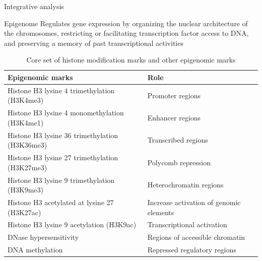 \documentclass[slidestop,compress,11pt,xcolor=dvipsnames]{beamer}
\begin{document}
\begin{frame}{Integrative analysis}
 \vspace*{-0.3cm}
\begin{block}{Epigenome}
       Regulates gene expression by organizing the nuclear architecture of the chromosomes, restricting or facilitating transcription factor access to DNA, and preserving a memory of past transcriptional activities
\end{block}

\begin{table}[]
\centering
\scriptsize
\caption[Histone and epigenomic marks]{Core set of histone modification marks and other epigenomic marks}
\begin{tabular}{ll}
\toprule
 \textbf{Epigenomic marks}   & \textbf{Role} \\ \toprule
 Histone H3 lysine 4 trimethylation (H3K4me3)  & Promoter regions \\
 Histone H3 lysine 4 monomethylation (H3K4me1) & Enhancer regions  \\
 Histone H3 lysine 36 trimethylation (H3K36me3) & Transcribed regions  \\
 Histone H3 lysine 27 trimethylation (H3K27me3) & Polycomb repression  \\
 Histone H3 lysine 9 trimethylation (H3K9me3) & Heterochromatin regions \\
 Histone H3 acetylated at lysine 27 (H3K27ac)  &  Increase activation of genomic elements\\
 Histone H3 lysine 9 acetylation  (H3K9ac)  & Transcriptional activation \\
 DNase hypersensitivity &  Regions of accessible chromatin \\
 DNA methylation & Repressed regulatory regions\\  \bottomrule
\end{tabular}
\end{table}
\end{frame}
\end{document}
